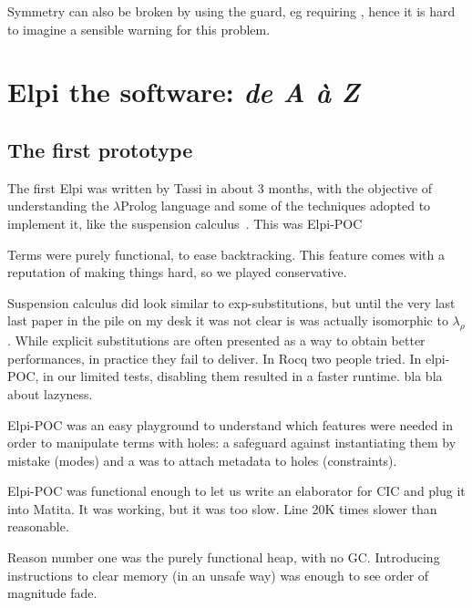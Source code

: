 \documentclass[a4paper, 11pt]{book}
\begin{document}
Symmetry can also be broken by using the guard, eg
requiring , hence it is hard to imagine a
sensible warning for this problem.



\chapter{Elpi the software: \emph{de A \`a Z}}

\section{The first prototype}

The first Elpi was written by Tassi in about 3 months, with the objective
of understanding the $\lambda$Prolog language and some of the techniques
adopted to implement it, like the suspension calculus~\cite{NADATHUR200235}.
This was Elpi-POC

Terms were purely functional, to ease backtracking. This feature comes
with a reputation of making things hard, so we played conservative.

Suspension calculus did look similar to exp-substitutions, but until the very
last last paper in the pile on my desk it was not clear is was actually isomorphic
to $\lambda_\rho$. While explicit substitutions are often presented as a way to
obtain better performances, in practice they fail to deliver. In Rocq two
people tried. In elpi-POC, in our limited tests, disabling them resulted in
a faster runtime.  bla bla about lazyness.

Elpi-POC was an easy playground to understand which features were needed in
order to manipulate terms with holes: a safeguard against instantiating them by
mistake (modes) and a was to attach metadata to holes (constraints).

Elpi-POC was functional enough to let us write an elaborator for CIC
and plug it into Matita. It was working, but it was too slow. Line 20K times
slower than reasonable.

Reason number one was the purely functional heap, with no GC. Introducing 
instructions to clear memory (in an unsafe way) was enough to see order of
magnitude fade.
\end{document}
